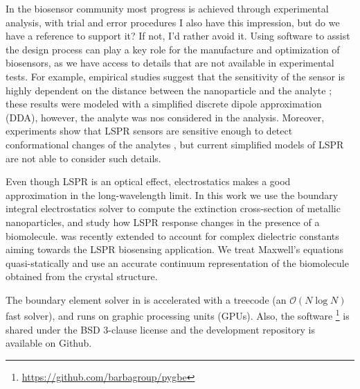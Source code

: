 In the biosensor community most progress is achieved 
through experimental analysis, with trial and error procedures {\color{blue} I also have this impression, but do we have a reference to support it? If not, I'd rather avoid it}. 
Using software to assist the design process can play a key role for the manufacture and optimization
of biosensors, as we have access to details that are not available in experimental tests.
For example, empirical studies suggest that the sensitivity of the sensor
is highly dependent on the distance between the nanoparticle and the analyte \cite{HaesETal2004};
these results were modeled with a simplified discrete dipole approximation (DDA), however, 
the analyte was nos considered in the analysis. Moreover, experiments show that 
LSPR sensors are sensitive enough to detect conformational changes of the analytes \cite{HallETal2011}, 
but current simplified models of LSPR are not able to consider such details.


Even though LSPR is an optical effect, electrostatics 
makes a good approximation in the long-wavelength limit. In this work we use
the boundary integral electrostatics solver \pygbe \cite{CooperETal2016} 
to compute the extinction cross-section of metallic nanoparticles, and study how LSPR 
response changes in the presence
of a biomolecule. \pygbe was recently extended to account for complex dielectric constants 
\cite{ClementiETal2017} aiming towards the LSPR biosensing application. We treat Maxwell's
equations quasi-statically \cite{MayergoyzZhang2007} and
use an accurate continuum representation of the biomolecule obtained from the
crystal structure. 

The boundary element solver in \pygbe
is accelerated with a treecode (an $\mathcal{O}(N\log N)$ fast solver), and runs on
graphic processing units (GPUs). Also, the software
\footnote{\url{https://github.com/barbagroup/pygbe}} is shared under the 
BSD 3-clause license and the development repository is available on Github.




